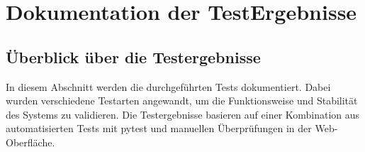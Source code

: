 \newpage
\section{Dokumentation der TestErgebnisse}\label{sec:dokumentation-der-testergebnisse}

\subsection{Überblick über die Testergebnisse}


\footnotesize


In diesem Abschnitt werden die durchgeführten Tests dokumentiert. Dabei wurden verschiedene Testarten angewandt, um die Funktionsweise und Stabilität des Systems zu validieren.
Die Testergebnisse basieren auf einer Kombination aus automatisierten Tests mit pytest und manuellen Überprüfungen in der Web-Oberfläche.\par

